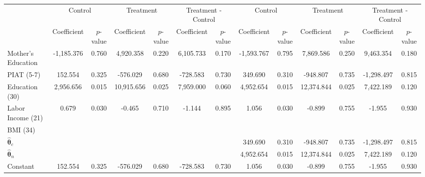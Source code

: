 \begin{tabular}{lcccccccccccc} \toprule
&\multicolumn{2}{c}{Control} & \multicolumn{2}{c}{Treatment} & \multicolumn{2}{c}{Treatment - Control} & \multicolumn{2}{c}{Control} & \multicolumn{2}{c}{Treatment} & \multicolumn{2}{c}{Treatment - Control} \\
 & Coefficient  & $p$-value  & Coefficient  & $p$-value & Coefficient  & $p$-value  & Coefficient  & $p$-value  & Coefficient  & $p$-value  & Coefficient  & $p$-value \\ \midrule
Mother's Education & -1,185.376 &     0.760 &  4,920.358 &     0.220 &  6,105.733 &     0.170 & -1,593.767 &     0.795 &  7,869.586 &     0.250 &  9,463.354 &     0.180 \\  
PIAT (5-7) &   152.554 &     0.325 &  -576.029 &     0.680 &  -728.583 &     0.730 &   349.690 &     0.310 &  -948.807 &     0.735 & -1,298.497 &     0.815 \\  
Education (30)  &  2,956.656 &     0.015 & 10,915.656 &     0.025 &  7,959.000 &     0.060 &  4,952.654 &     0.015 & 12,374.844 &     0.025 &  7,422.189 &     0.120 \\  
Labor Income (21) &     0.679 &     0.030 &    -0.465 &     0.710 &    -1.144 &     0.895 &     1.056 &     0.030 &    -0.899 &     0.755 &    -1.955 &     0.930 \\  
BMI (34) &        &        &        &        &        &        &        &        &        &        &        &         \\
$\hat{\bm{\theta}}_{c}$ &        &        &        &        &        &        &   349.690 &     0.310 &  -948.807 &     0.735 & -1,298.497 &     0.815 \\  
$\hat{\bm{\theta}}_{n}$ &        &        &        &        &        &        &  4,952.654 &     0.015 & 12,374.844 &     0.025 &  7,422.189 &     0.120 \\  
Constant &   152.554 &     0.325 &  -576.029 &     0.680 &  -728.583 &     0.730 &     1.056 &     0.030 &    -0.899 &     0.755 &    -1.955 &     0.930 \\  
\bottomrule \end{tabular}